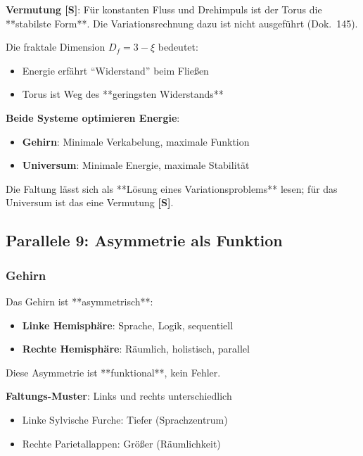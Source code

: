 	\textbf{Vermutung \textbf{[S]}}: Für konstanten Fluss und Drehimpuls ist der Torus die **stabilste Form**. Die Variationsrechnung dazu ist nicht ausgeführt (Dok.~145).

	Die fraktale Dimension $D_f = 3-\xi$ bedeutet:
	\begin{itemize}
		\item Energie erfährt \enquote{Widerstand} beim Fließen
		\item Torus ist Weg des **geringsten Widerstands**
	\end{itemize}

	\begin{keyresult}
		\textbf{Beide Systeme optimieren Energie}:

		\begin{itemize}
			\item \textbf{Gehirn}: Minimale Verkabelung, maximale Funktion
			\item \textbf{Universum}: Minimale Energie, maximale Stabilität
		\end{itemize}

		Die Faltung lässt sich als **Lösung eines Variationsproblems** lesen; für das Universum ist das eine Vermutung \textbf{[S]}.
	\end{keyresult}

	\subsection{Parallele 9: Asymmetrie als Funktion}

	\subsubsection{Gehirn}

	Das Gehirn ist **asymmetrisch**:

	\begin{itemize}
		\item \textbf{Linke Hemisphäre}: Sprache, Logik, sequentiell
		\item \textbf{Rechte Hemisphäre}: Räumlich, holistisch, parallel
	\end{itemize}

	Diese Asymmetrie ist **funktional**, kein Fehler.

	\textbf{Faltungs-Muster}: Links und rechts unterschiedlich
	\begin{itemize}
		\item Linke Sylvische Furche: Tiefer (Sprachzentrum)
		\item Rechte Parietallappen: Größer (Räumlichkeit)
	\end{itemize}

